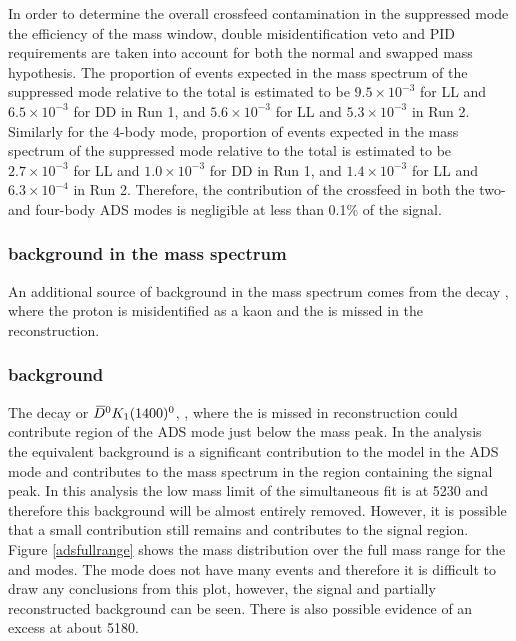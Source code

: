 In order to determine the overall crossfeed contamination in the suppressed \pik mode the efficiency of the \Dz mass window, double misidentification veto and PID requirements are taken into account for both the normal and swapped \Dz mass hypothesis. The proportion of events expected in the \Bm mass spectrum of the suppressed \pik mode relative to the total \pik is estimated to be $9.5 \times 10^{-3}$ for LL and $6.5 \times 10^{-3}$ for DD in Run 1, and $5.6 \times 10^{-3}$ for LL and $5.3 \times 10^{-3}$ in Run 2. Similarly for the 4-body mode, proportion of events expected in the \Bm mass spectrum of the suppressed \pikpipi mode relative to the total \pikpipi is estimated to be $2.7 \times 10^{-3}$ for LL and $1.0 \times 10^{-3}$ for DD in Run 1, and $1.4 \times 10^{-3}$ for LL and $6.3 \times 10^{-4}$ in Run 2. Therefore, the contribution of the crossfeed in both the two- and four-body ADS modes is negligible at less than 0.1\% of the signal.


\subsubsection{\boldmath \decay{\Lb}{\Lc\Kstar} background in the \kk mass spectrum}
\label{sec:backgrounds:Lb2LcKst}

An additional source of background in the \kk \Bm mass spectrum comes from the decay , where the proton is misidentified as a kaon and the \pion is missed in the reconstruction. 

\subsubsection{\boldmath {} background}
\label{sec:backgrounds:bs}

The decay  or ${{\kern 0.2em\overline{\kern -0.2em D}{}}{}^0} K_1(1400)^0$, , where the \pip is missed in reconstruction could contribute region of the \pik ADS mode just below the \Bm mass peak. In the  analysis~\cite{LHCb-PAPER-2016-003} the equivalent  background is a significant contribution to the model in the \pik ADS mode and contributes to the \Bm mass spectrum in the region containing the signal peak. In this analysis the low mass limit of the simultaneous fit is at 5230 \mev and therefore this background will be almost entirely removed. However, it is possible that a small contribution still remains and contributes to the signal region. Figure \ref{adsfullrange} shows the \B mass distribution over the full mass range for the \kpi and \pik modes. The \pik mode does not have many events and therefore it is difficult to draw any conclusions from this plot, however, the signal and partially reconstructed background can be seen. There is also possible evidence of an excess at about 5180\mev.

